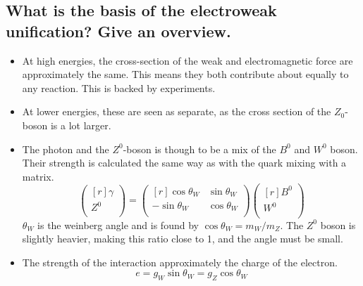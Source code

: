 \documentclass{article}
\begin{document}
\subsection{What is the basis of the electroweak unification? Give an overview.}
\begin{itemize}
    \item At high energies, the cross-section of the weak and electromagnetic force are approximately the same. This means they both contribute about equally to any reaction. This is backed by experiments. 
    \item At lower energies, these are seen as separate, as the cross section of the $Z_0$-boson is a lot larger.  
    \item The photon and the $Z^{0}$-boson is though to be a mix of the $B^{0}$ and $W^{0}$ boson. Their strength is calculated the same way as with the quark mixing with a matrix. 
    \begin{equation}
      \begin{pmatrix*}[r]
       γ \\
       Z^{0} \\
      \end{pmatrix*} = 
      \begin{pmatrix*}[r]
       \cos θ_{W} & \sin θ_{W} \\
       - \sin θ_{W} & \cos θ_{W} \\
      \end{pmatrix*}
      \begin{pmatrix*}[r]
       B^{0} \\
       W^{0} \\
      \end{pmatrix*}
    \end{equation}
    $θ_{W}$ is the weinberg angle and is found by $\cos θ_{W} = m_{W} / m_{Z}$. The $Z^{0}$ boson is slightly heavier, making this ratio close to 1, and the angle must be small. 
    \item The strength of the interaction approximately the charge of the electron.
    \begin{equation}
    e = g_{W} \sin θ_{W} = g_{Z}\cos θ_{W}
    \end{equation}
\end{itemize}
\end{document}
